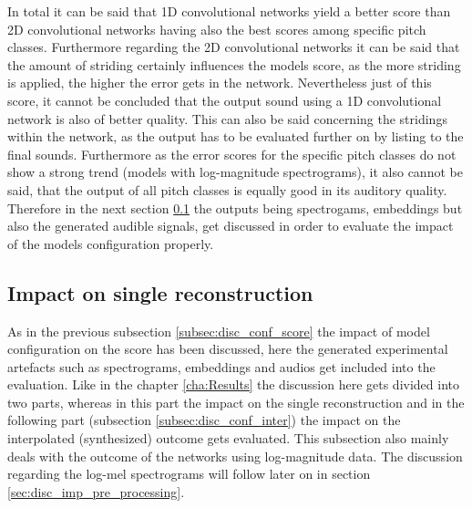 In total it can be said that 1D convolutional networks yield a better score than 2D convolutional networks having also the best scores among specific pitch classes. Furthermore regarding the 2D convolutional networks it can be said that the amount of striding certainly influences the models score, as the more striding is applied, the higher the error gets in the network. Nevertheless just of this score, it cannot be concluded that the output sound using a 1D convolutional network is also of better quality. This can also be said concerning the stridings within the network, as the output has to be evaluated further on by listing to the final sounds. Furthermore as the error scores for the specific pitch classes do not show a strong trend (models with log-magnitude spectrograms), it also cannot be said, that the output of all pitch classes is equally good in its auditory quality. Therefore in the next section \ref{subsec:disc_conf_single_rec} the outputs being spectrogams, embeddings but also the generated audible signals, get discussed in order to evaluate the impact of the models configuration properly.

\subsection{Impact on single reconstruction}
\label{subsec:disc_conf_single_rec}
As in the previous subsection \ref{subsec:disc_conf_score} the impact of model configuration on the score has been discussed, here the generated experimental artefacts such as spectrograms, embeddings and audios get included into the evaluation. Like in the chapter \ref{cha:Results} the discussion here gets divided into two parts, whereas in this part the impact on the single reconstruction and in the following part (subsection \ref{subsec:disc_conf_inter}) the impact on the interpolated (synthesized) outcome gets evaluated. 
This subsection also mainly deals with the outcome of the networks using log-magnitude data. The discussion regarding the log-mel spectrograms will follow later on in section \ref{sec:disc_imp_pre_processing}.

\newpage
